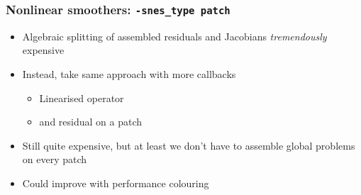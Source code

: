 \documentclass[presentation,aspectratio=43,10pt]{beamer}
\begin{document}
\begin{frame}
  \frametitle{Nonlinear smoothers: \texttt{-snes\_type patch}}
  \begin{itemize}
  \item Algebraic splitting of assembled residuals and Jacobians
    \emph{tremendously} expensive
  \item Instead, take same approach with more callbacks
    \begin{itemize}
    \item Linearised operator
    \item and residual on a patch
    \end{itemize}
  \item Still quite expensive, but at least we don't have to assemble
    global problems on every patch
  \item Could improve with performance colouring
  \end{itemize}
\end{frame}
\end{document}
